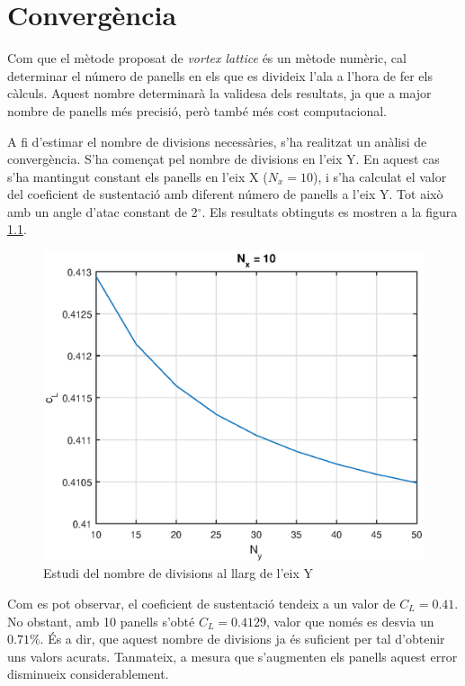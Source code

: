 \chapter{Convergència}
Com que el mètode proposat de \textit{vortex lattice} és un mètode numèric, cal determinar el número de panells en els que es divideix l'ala a l'hora de fer els càlculs. Aquest nombre determinarà la validesa dels resultats, ja que a major nombre de panells més precisió, però també més cost computacional.

A fi d'estimar el nombre de divisions necessàries, s'ha realitzat un anàlisi de convergència. S'ha començat pel nombre de divisions en l'eix Y. En aquest cas s'ha mantingut constant els panells en l'eix X ($N_{x}=10$), i s'ha calculat el valor del coeficient de sustentació amb diferent número de panells a l'eix Y. Tot això amb un angle d'atac constant de 2$^{\circ}$. Els resultats obtinguts es mostren a la figura \ref{ny}.

\begin{figure}[H]
	\centering
	\includegraphics[scale=0.95]{./plots/nycl}
	\caption{Estudi del nombre de divisions al llarg de l'eix Y}
	\label{ny}
\end{figure}

Com es pot observar, el coeficient de sustentació tendeix a un valor de $C_{L}=0.41$. No obstant, amb 10 panells s'obté $C_{L}=0.4129$, valor que només es desvia un $0.71\%$. És a dir, que aquest nombre de divisions ja és suficient per tal d'obtenir uns valors acurats. Tanmateix, a mesura que s'augmenten els panells aquest error disminueix considerablement.

